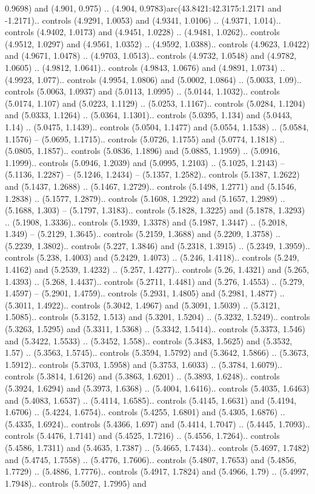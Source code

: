 0.9698) and (4.901, 0.975) .. (4.904, 0.9783)arc(43.8421:42.3175:1.2171 and -1.2171).. controls (4.9291, 1.0053) and (4.9341, 1.0106) .. (4.9371, 1.014).. controls (4.9402, 1.0173) and (4.9451, 1.0228) .. (4.9481, 1.0262).. controls (4.9512, 1.0297) and (4.9561, 1.0352) .. (4.9592, 1.0388).. controls (4.9623, 1.0422) and (4.9671, 1.0478) .. (4.9703, 1.0513).. controls (4.9732, 1.0548) and (4.9782, 1.0605) .. (4.9812, 1.0641).. controls (4.9843, 1.0676) and (4.9891, 1.0734) .. (4.9923, 1.077).. controls (4.9954, 1.0806) and (5.0002, 1.0864) .. (5.0033, 1.09).. controls (5.0063, 1.0937) and (5.0113, 1.0995) .. (5.0144, 1.1032).. controls (5.0174, 1.107) and (5.0223, 1.1129) .. (5.0253, 1.1167).. controls (5.0284, 1.1204) and (5.0333, 1.1264) .. (5.0364, 1.1301).. controls (5.0395, 1.134) and (5.0443, 1.14) .. (5.0475, 1.1439).. controls (5.0504, 1.1477) and (5.0554, 1.1538) .. (5.0584, 1.1576) -- (5.0695, 1.1715).. controls (5.0726, 1.1755) and (5.0774, 1.1818) .. (5.0805, 1.1857).. controls (5.0836, 1.1896) and (5.0885, 1.1959) .. (5.0916, 1.1999).. controls (5.0946, 1.2039) and (5.0995, 1.2103) .. (5.1025, 1.2143) -- (5.1136, 1.2287) -- (5.1246, 1.2434) -- (5.1357, 1.2582).. controls (5.1387, 1.2622) and (5.1437, 1.2688) .. (5.1467, 1.2729).. controls (5.1498, 1.2771) and (5.1546, 1.2838) .. (5.1577, 1.2879).. controls (5.1608, 1.2922) and (5.1657, 1.2989) .. (5.1688, 1.303) -- (5.1797, 1.3183).. controls (5.1828, 1.3225) and (5.1878, 1.3293) .. (5.1908, 1.3336).. controls (5.1939, 1.3378) and (5.1987, 1.3447) .. (5.2018, 1.349) -- (5.2129, 1.3645).. controls (5.2159, 1.3688) and (5.2209, 1.3758) .. (5.2239, 1.3802).. controls (5.227, 1.3846) and (5.2318, 1.3915) .. (5.2349, 1.3959).. controls (5.238, 1.4003) and (5.2429, 1.4073) .. (5.246, 1.4118).. controls (5.249, 1.4162) and (5.2539, 1.4232) .. (5.257, 1.4277).. controls (5.26, 1.4321) and (5.265, 1.4393) .. (5.268, 1.4437).. controls (5.2711, 1.4481) and (5.276, 1.4553) .. (5.279, 1.4597) -- (5.2901, 1.4759).. controls (5.2931, 1.4805) and (5.2981, 1.4877) .. (5.3011, 1.4922).. controls (5.3042, 1.4967) and (5.3091, 1.5039) .. (5.3121, 1.5085).. controls (5.3152, 1.513) and (5.3201, 1.5204) .. (5.3232, 1.5249).. controls (5.3263, 1.5295) and (5.3311, 1.5368) .. (5.3342, 1.5414).. controls (5.3373, 1.546) and (5.3422, 1.5533) .. (5.3452, 1.558).. controls (5.3483, 1.5625) and (5.3532, 1.57) .. (5.3563, 1.5745).. controls (5.3594, 1.5792) and (5.3642, 1.5866) .. (5.3673, 1.5912).. controls (5.3703, 1.5958) and (5.3753, 1.6033) .. (5.3784, 1.6079).. controls (5.3814, 1.6126) and (5.3863, 1.6201) .. (5.3893, 1.6248).. controls (5.3924, 1.6294) and (5.3973, 1.6368) .. (5.4004, 1.6416).. controls (5.4035, 1.6463) and (5.4083, 1.6537) .. (5.4114, 1.6585).. controls (5.4145, 1.6631) and (5.4194, 1.6706) .. (5.4224, 1.6754).. controls (5.4255, 1.6801) and (5.4305, 1.6876) .. (5.4335, 1.6924).. controls (5.4366, 1.697) and (5.4414, 1.7047) .. (5.4445, 1.7093).. controls (5.4476, 1.7141) and (5.4525, 1.7216) .. (5.4556, 1.7264).. controls (5.4586, 1.7311) and (5.4635, 1.7387) .. (5.4665, 1.7434).. controls (5.4697, 1.7482) and (5.4745, 1.7558) .. (5.4776, 1.7606).. controls (5.4807, 1.7653) and (5.4856, 1.7729) .. (5.4886, 1.7776).. controls (5.4917, 1.7824) and (5.4966, 1.79) .. (5.4997, 1.7948).. controls (5.5027, 1.7995) and 